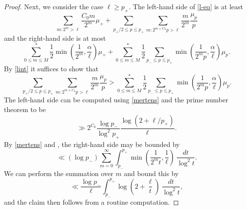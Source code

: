 \documentclass[10pt,a4paper,reqno]{amsart}
\numberwithin{equation}{section}
\theoremstyle{plain}
\theoremstyle{definition}
\begin{document}
\begin{proof}
Next, we consider the case $\ell \geq p_+$.  The left-hand side of \eqref{l-eq} is at least 
$$ \sum_{m: 2^m > \ell} \frac{C_0 m}{2^m} \mu_+ 
+ \sum_{p_+/2 \leq p \leq p_+} \sum_{m: 2^{m+C_0} p > \ell} \frac{m}{2^m} \frac{\mu_p}{p}$$
and the right-hand side is at most
\begin{equation}\label{amp} 
  \sum_{0 \leq m \leq M}^* \frac{1}{2} \min(\frac{1}{2^m}, \frac{\alpha}{\ell})\mu_+ + \sum_{0 \leq m \leq M}^* \frac{1}{2} \sum_{p_- \leq p \leq p_+} \min\left(\frac{1}{2^mp}, \frac{\alpha}{\ell}\right) \mu_p.
\end{equation}
By \eqref{lint} it suffices to show that
$$
\sum_{p_+/2 \leq p \leq p_+} \sum_{m: 2^{m+C_0} p > \ell} \frac{m}{2^m} \frac{\mu_p}{p}
> \sum_{0 \leq m \leq M}^* \frac{1}{2} \sum_{p_- \leq p \leq p_+} \min\left(\frac{1}{2^mp}, \frac{\alpha}{\ell}\right) \mu_p.$$
The left-hand side can be computed using \eqref{mertens} and the prime number theorem to be
$$ \gg 2^{C_0} \frac{\log p_-}{\log^2 p_+} \frac{\log (2+\ell/p_+)}{\ell}.$$
By \eqref{mertens} and , the right-hand side may be bounded by
$$ \ll (\log p_-) \sum_{m=0}^\infty \int_{p_-}^{p_+} \min\left(\frac{1}{2^m t}, \frac{1}{\ell}\right)\ \frac{dt}{\log^2 t}.$$
We can perform the summation over $m$ and bound this by
$$ \ll \frac{\log p_-}{\ell} \int_{p_-}^{p_+} \log\left(2 + \frac{\ell}{t}\right)\ \frac{dt}{\log^2 t},$$
and the claim then follows from a routine computation.


\end{proof}
\end{document}
